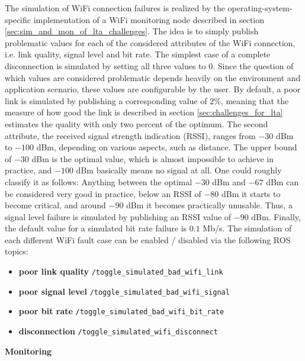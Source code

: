 \documentclass[english, master, utf8]{base/thesis_KBS}
\newcommand{\code}[1]{\colorbox{light-gray}{\texttt{#1}}}
\begin{document}
The simulation of WiFi connection failures is realized by the operating-system-specific implementation of a WiFi monitoring node described in section
\ref{sec:sim_and_mon_of_lta_challenges}. The idea is to simply publish problematic values for each of the considered attributes of the WiFi connection,
i.e. link quality, signal level and bit rate. The simplest case of a complete disconnection is simulated by setting all three values to $0$.
Since the question of which values are considered problematic depends heavily on the environment and application scenario, these values are configurable by the user.
By default, a poor link is simulated by publishing a corresponding value of $2\%$, meaning that the measure of how good the link is described in section
\ref{sec:challenges_for_lta} estimates the quality with only two percent of the optimum. The second attribute, the received signal strength indication (RSSI),
ranges from $-30$ dBm to $-100$ dBm, depending on various aspects, such as distance. \cite{Heurtefeux:2012} The upper bound of $-30$ dBm is the optimal value, which
is almost impossible to achieve in practice, and $-100$ dBm basically means no signal at all. One could roughly classify it as follows: Anything between the optimal
$-30$ dBm and $-67$ dBm can be considered very good in practice, below an RSSI of $-80$ dBm it starts to become critical, and around $-90$ dBm it becomes practically 
unusable. \cite{metageek} Thus, a signal level failure is simulated by publishing an RSSI value of $-90$ dBm. Finally, the default value for a simulated bit rate failure 
is $0.1$ Mb/s. The simulation of each different WiFi fault case can be enabled / disabled via the following ROS topics:
\begin{itemize}
    \item \textbf{poor link quality} \textrightarrow \code{/toggle\_simulated\_bad\_wifi\_link}
    \item \textbf{poor signal level} \textrightarrow \code{/toggle\_simulated\_bad\_wifi\_signal}
    \item \textbf{poor bit rate} \textrightarrow \code{/toggle\_simulated\_bad\_wifi\_bit\_rate}
    \item \textbf{disconnection} \textrightarrow \code{/toggle\_simulated\_wifi\_disconnect}\newline
\end{itemize}

\noindent
\textbf{Monitoring}\newline
\end{document}
